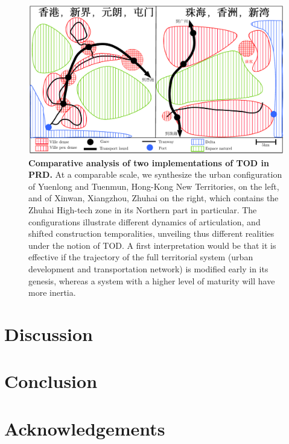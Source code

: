 \begin{figure}
	\includegraphics[width=\linewidth]{figures/1-3-1-fig-qualitative-schema.pdf}
	\caption{\textbf{Comparative analysis of two implementations of TOD in PRD.} At a comparable scale, we synthesize the urban configuration of Yuenlong and Tuenmun, Hong-Kong New Territories, on the left, and of Xinwan, Xiangzhou, Zhuhai on the right, which contains the Zhuhai High-tech zone in its Northern part in particular. The configurations illustrate different dynamics of articulation, and shifted construction temporalities, unveiling thus different realities under the notion of TOD. A first interpretation would be that it is effective if the trajectory of the full territorial system (urban development and transportation network) is modified early in its genesis, whereas a system with a higher level of maturity will have more inertia.\label{fig:qualitative:schema}}
\end{figure}







\section{Discussion}







\section*{Conclusion}





\section*{Acknowledgements}



















